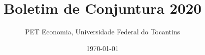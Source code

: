 

\title{Boletim de Conjuntura 2020}
\author{PET Economia, Universidade Federal do Tocantins}
\date{\today}



	\onecolumn

	
	
	

	

	
	

	\twocolumn


	
	
	
	
	
	

	

